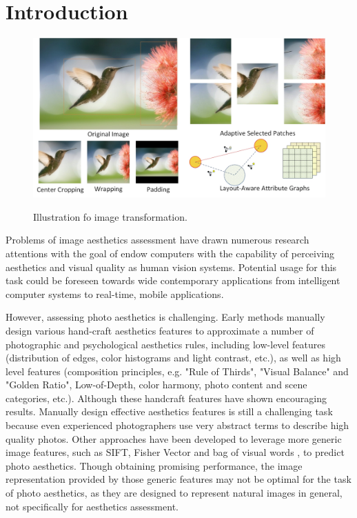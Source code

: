 \documentclass[10pt,twocolumn,letterpaper]{article}
\begin{document}
\section{Introduction} \label{intro}

\begin{figure}
	\centering
	\includegraphics[scale=0.25]{figures/intro}
	\label{transform}
	\caption{Illustration fo image transformation.}
\end{figure}
Problems of image aesthetics assessment 
have drawn numerous research attentions with the goal of 
endow computers with the capability of perceiving aesthetics and
visual quality as human vision systems. Potential usage for this task could be foreseen towards wide contemporary applications from intelligent computer
systems to real-time, mobile applications. 

However, assessing photo aesthetics is challenging. 
Early methods \cite{Datta:2006:ECCV,Ke:2006:CVPR} manually design various hand-craft aesthetics features to approximate a number of photographic and psychological aesthetics rules, including low-level features \cite{Luo:2008:ECCV,Bhattacharya:2010:ACMMM} (distribution of edges, color histograms and light contrast, etc.), as well as high level features \cite{Tang:2013:TMM,Sagnik:2011:CVPR,Su:2011:ACMMM,Cohen-Or:2006:SIGGRAPH} (composition principles, e.g. "Rule of Thirds", "Visual Balance" and "Golden Ratio", Low-of-Depth, color harmony, photo content and scene categories, etc.). 
Although these handcraft features have shown encouraging 
results. Manually design effective aesthetics features is still a challenging task because even experienced photographers use very abstract terms to describe high quality photos.
Other approaches have been developed to leverage more generic image features, such as SIFT, Fisher Vector 
\cite{Marchesotti:2011:ICCV,Perronnin:2010:ECCV} and bag of visual words \cite{Su:2011:ACMMM}, to predict photo aesthetics. Though obtaining
promising performance, the image representation provided
by those generic features may not be optimal for the 
task of photo aesthetics, as they are designed to represent natural images in
general, not specifically for aesthetics assessment.
\end{document}
